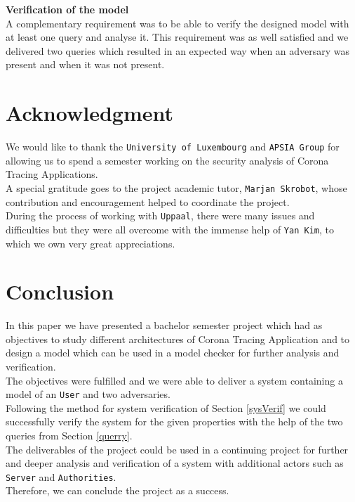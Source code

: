 \documentclass[a4paper, twocolumn]{article}
\begin{document}
\noindent\textbf{Verification of the model}\\
A complementary requirement was to be able to verify the designed model with at least one query and analyse it. This requirement was as well satisfied and we delivered two queries which resulted in an expected way when an adversary was present and when it was not present.

\section*{Acknowledgment}
We would like to thank the \texttt{University of Luxembourg} and \texttt{APSIA Group} \cite{apsia} for allowing us to spend a semester working on the security analysis of Corona Tracing Applications.\\
A special gratitude goes to the project academic tutor, \texttt{Marjan Skrobot}, whose contribution and encouragement helped to coordinate the project.\\
During the process of working with \texttt{Uppaal}, there were many issues and difficulties but they were all overcome with the immense help of \texttt{Yan Kim}, to which we own very great appreciations. 

\section{Conclusion}
In this paper we have presented a bachelor semester project which had as objectives to study different architectures of Corona Tracing Application and to design a model which can be used in a model checker for further analysis and verification.\\
The objectives were fulfilled and we were able to deliver a system containing a model of an \texttt{User} and two adversaries.\\
Following the method for system verification of Section \ref{sysVerif} we could successfully verify the system for the given properties with the help of the two queries from Section \ref{querry}.\\
The deliverables of the project could be used in a continuing project for further and deeper analysis and verification of a system with additional actors such as \texttt{Server} and \texttt{Authorities}.\\
Therefore, we can conclude the project as a success.\\
\end{document}
